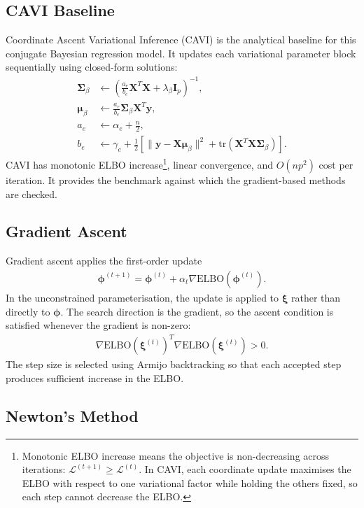 \documentclass[11pt,a4paper]{article}
\newcommand{\ELBO}{\text{ELBO}}
\newcommand{\tr}{\text{tr}}
\begin{document}
\subsection{CAVI Baseline}

Coordinate Ascent Variational Inference (CAVI) is the analytical baseline for this conjugate Bayesian regression model. It updates each variational parameter block sequentially using closed-form solutions:
\begin{align}
\bm{\Sigma}_\beta &\leftarrow \left(\frac{a_e}{b_e} \bm{X}^T\bm{X} + \lambda_\beta \bm{I}_p\right)^{-1},\\
\bm{\mu}_\beta &\leftarrow \frac{a_e}{b_e} \bm{\Sigma}_\beta \bm{X}^T\bm{y},\\
a_e &\leftarrow \alpha_e + \frac{n}{2},\\
b_e &\leftarrow \gamma_e + \frac{1}{2}\left[\|\bm{y} - \bm{X}\bm{\mu}_\beta\|^2 + \tr(\bm{X}^T\bm{X}\bm{\Sigma}_\beta)\right].
\end{align}
CAVI has monotonic ELBO increase\footnote{Monotonic ELBO increase means the objective is non-decreasing across iterations: $\mathcal{L}^{(t+1)} \geq \mathcal{L}^{(t)}$. In CAVI, each coordinate update maximises the ELBO with respect to one variational factor while holding the others fixed, so each step cannot decrease the ELBO.}, linear convergence, and $O(np^2)$ cost per iteration. It provides the benchmark against which the gradient-based methods are checked.

\subsection{Gradient Ascent}

Gradient ascent applies the first-order update
\begin{align}
\bm{\phi}^{(t+1)} = \bm{\phi}^{(t)} + \alpha_t \nabla\ELBO(\bm{\phi}^{(t)}).
\end{align}
In the unconstrained parameterisation, the update is applied to $\bm{\xi}$ rather than directly to $\bm{\phi}$. The search direction is the gradient, so the ascent condition is satisfied whenever the gradient is non-zero:
\begin{align}
\nabla\ELBO(\bm{\xi}^{(t)})^T \nabla\ELBO(\bm{\xi}^{(t)}) > 0.
\end{align}
The step size is selected using Armijo backtracking so that each accepted step produces sufficient increase in the ELBO.

\subsection{Newton's Method}
\end{document}
